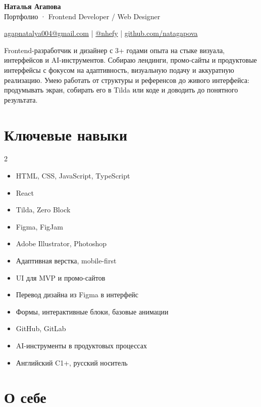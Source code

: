 \documentclass[11pt,a4paper]{article}
\begin{document}
{\fontsize{24}{28}\selectfont\textbf{Наталья Агапова}}\\[0.2em]
{\large Портфолио · Frontend Developer / Web Designer}

\vspace{0.4em}

\href{mailto:agapnatalya004@gmail.com}{agapnatalya004@gmail.com}
\quad|\quad
\href{https://t.me/nhefy}{@nhefy}
\quad|\quad
\href{https://github.com/natagapova}{github.com/natagapova}

\vspace{0.8em}

\textcolor{textgray}{
Frontend-разработчик и дизайнер с 3+ годами опыта на стыке визуала, интерфейсов и AI-инструментов. Собираю лендинги, промо-сайты и продуктовые интерфейсы с фокусом на адаптивность, визуальную подачу и аккуратную реализацию. Умею работать от структуры и референсов до живого интерфейса: продумывать экран, собирать его в Tilda или коде и доводить до понятного результата.
}

\section*{Ключевые навыки}

\begin{multicols}{2}
\begin{itemize}
  \item HTML, CSS, JavaScript, TypeScript
  \item React
  \item Tilda, Zero Block
  \item Figma, FigJam
  \item Adobe Illustrator, Photoshop
  \item Адаптивная верстка, mobile-first
  \item UI для MVP и промо-сайтов
  \item Перевод дизайна из Figma в интерфейс
  \item Формы, интерактивные блоки, базовые анимации
  \item GitHub, GitLab
  \item AI-инструменты в продуктовых процессах
  \item Английский C1+, русский носитель
\end{itemize}
\end{multicols}

\section*{О себе}
\end{document}

